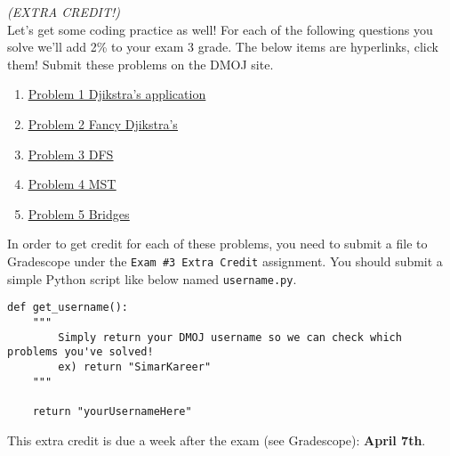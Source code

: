 \documentclass{article}
\newcounter{ProblemCounter}
\newenvironment{problem}[1][Problem]{
 \begin{trivlist}
 \item[\hskip \labelsep {\bfseries #1}\hskip \labelsep {%
 \bfseries \theProblemCounter.%
 \stepcounter{ProblemCounter}%
 }]
}{
 \end{trivlist}
}
\begin{document}
\pagebreak
\begin{problem}\textit{(EXTRA CREDIT!)}\\
Let's get some coding practice as well!  For each of the following questions you solve we'll add 2\% to your exam 3 grade. The below items are hyperlinks, click them! Submit these problems on the DMOJ site.
\begin{enumerate}[label=\textbf{\alph*.)}]
\item \underline{\href{https://dmoj.ca/problem/ddrp3}{Problem 1 Djikstra's application}}
\item \underline{\href{https://dmoj.ca/problem/coci06c1p4}{Problem 2 Fancy Djikstra's}}
\item \underline{\href{https://dmoj.ca/problem/ccc07s3}{Problem 3 DFS}}
\item \underline{\href{https://dmoj.ca/problem/ccc17s4}{Problem 4 MST}}
\item \underline{\href{https://dmoj.ca/problem/dwite07c2p5}{Problem 5 Bridges}}
\end{enumerate}

\noindent
In order to get credit for each of these problems, you need to submit a file to Gradescope under the \texttt{Exam \#3 Extra Credit} assignment. You should submit a simple Python script like below named \texttt{username.py}.
\begin{lstlisting}
def get_username():
    """
        Simply return your DMOJ username so we can check which problems you've solved!
        ex) return "SimarKareer"
    """

    return "yourUsernameHere"
\end{lstlisting}

This extra credit is due a week after the exam (see Gradescope): \textbf{April 7th}.
\end{problem}
\end{document}
